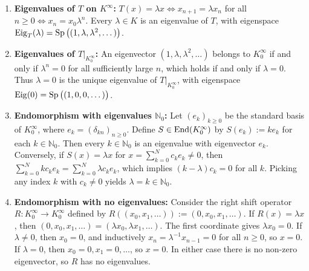 \begin{exercisesolution*}
\label{sol:eigenvalues_infinite_dimensional_sequences}
\begin{enumerate}[label=\textbf{(\alph*)}]
    \item \textbf{Eigenvalues of $T$ on $K^\infty$:}
    $T(x) = \lambda x \iff x_{n+1} = \lambda x_n$ for all $n \ge 0 \iff x_n = x_0 \lambda^n$.
    Every $\lambda \in K$ is an eigenvalue of $T$, with eigenspace $\operatorname{Eig}_T(\lambda) = \operatorname{Sp}\big((1, \lambda, \lambda^2, \dots)\big)$.

    \item \textbf{Eigenvalues of $T|_{K_0^\infty}$:}
    An eigenvector $(1, \lambda, \lambda^2, \dots)$ belongs to $K_0^\infty$ if and only if $\lambda^n = 0$ for all sufficiently large $n$, which holds if and only if $\lambda = 0$.
    Thus $\lambda = 0$ is the unique eigenvalue of $T|_{K_0^\infty}$, with eigenspace $\operatorname{Eig}(0) = \operatorname{Sp}\big((1, 0, 0, \dots)\big)$.

    \item \textbf{Endomorphism with eigenvalues $\mathbb{N}_0$:}
    Let $(e_k)_{k \ge 0}$ be the standard basis of $K_0^\infty$, where $e_k = (\delta_{kn})_{n \ge 0}$. Define $S \in \operatorname{End}(K_0^\infty)$ by $S(e_k) := k e_k$ for each $k \in \mathbb{N}_0$.
    Then every $k \in \mathbb{N}_0$ is an eigenvalue with eigenvector $e_k$. Conversely, if $S(x) = \lambda x$ for $x = \sum_{k=0}^N c_k e_k \ne 0$, then $\sum_{k=0}^N k c_k e_k = \sum_{k=0}^N \lambda c_k e_k$, which implies $(k - \lambda) c_k = 0$ for all $k$. Picking any index $k$ with $c_k \ne 0$ yields $\lambda = k \in \mathbb{N}_0$.

    \item \textbf{Endomorphism with no eigenvalues:}
    Consider the right shift operator $R \colon K_0^\infty \to K_0^\infty$ defined by $R((x_0, x_1, \dots)) := (0, x_0, x_1, \dots)$.
    If $R(x) = \lambda x$, then $(0, x_0, x_1, \dots) = (\lambda x_0, \lambda x_1, \dots)$.
    The first coordinate gives $\lambda x_0 = 0$. If $\lambda \ne 0$, then $x_0 = 0$, and inductively $x_n = \lambda^{-1} x_{n-1} = 0$ for all $n \ge 0$, so $x = 0$. If $\lambda = 0$, then $x_0 = 0, x_1 = 0, \dots$, so $x = 0$.
    In either case there is no non-zero eigenvector, so $R$ has no eigenvalues. \qedhere
\end{enumerate}
\end{exercisesolution*}

